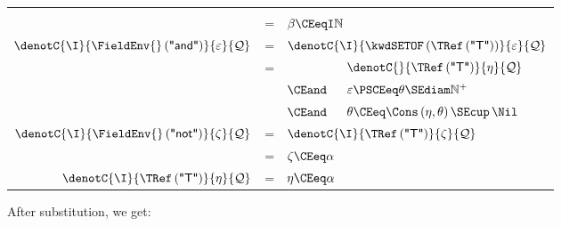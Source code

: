 \begin{tabular}{rcll}
{    }\\
  & \hspace*{-4mm} = 
  & \multicolumn{2}{l}{
      \hspace*{-4mm}
      $\beta \CEeqI \mathbb{N}$
    }\\ 
    $\denotC{\I}{\FieldEnv{} \, (\textsf{"and"})}{\varepsilon}{{\cal
     Q}}$
  & \hspace*{-4mm} = 
  & \multicolumn{2}{l}{
      \hspace*{-4mm}
      $\denotC{\I}{\kwdSETOF \, (\TRef \,
       (\textsf{"T"}))}{\varepsilon}{{\cal Q}}$
    }\\
  & \hspace*{-4mm} = 
  &
  & \hspace*{-4mm}
    $\denotC{}{\TRef \, (\textsf{"T"})}{\eta}{{\cal Q}}$\\
  & 
  & \hspace{-4mm}
    $\CEand$
  & \hspace*{-4mm}
    $\varepsilon \PSCEeq \theta \SEdiam \mathbb{N}^{+}$\\
  &  
  & \hspace*{-4mm}
    $\CEand$
  & \hspace*{-4mm}
    $\theta \CEeq \Cons \, (\eta, \theta) \, \SEcup \, \Nil$\\
    $\denotC{\I}{\FieldEnv{} \, (\textsf{"not"})}{\zeta}{{\cal Q}}$
  & \hspace*{-4mm} = 
  & \multicolumn{2}{l}{
      \hspace*{-4mm}
      $\denotC{\I}{\TRef \, (\textsf{"T"})}{\zeta}{{\cal Q}}$
    }\\
  & \hspace*{-4mm} = 
  & \multicolumn{2}{l}{
      \hspace*{-4mm}
      $\zeta \CEeq \alpha$
    }\\
    $\denotC{\I}{\TRef \, (\textsf{"T"})}{\eta}{{\cal Q}}$
  & \hspace*{-4mm} = 
  & \multicolumn{2}{l}{
      \hspace*{-4mm}
      $\eta \CEeq \alpha$
    }
\end{tabular}

\smallskip

\noindent
After substitution, we get:

